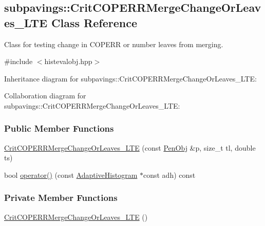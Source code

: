 \hypertarget{classsubpavings_1_1CritCOPERRMergeChangeOrLeaves__LTE}{\subsection{subpavings\-:\-:\-Crit\-C\-O\-P\-E\-R\-R\-Merge\-Change\-Or\-Leaves\-\_\-\-L\-T\-E \-Class \-Reference}
\label{classsubpavings_1_1CritCOPERRMergeChangeOrLeaves__LTE}
}


\-Class for testing change in \-C\-O\-P\-E\-R\-R or number leaves from merging.  




{\ttfamily \#include $<$histevalobj.\-hpp$>$}



\-Inheritance diagram for subpavings\-:\-:\-Crit\-C\-O\-P\-E\-R\-R\-Merge\-Change\-Or\-Leaves\-\_\-\-L\-T\-E\-:


\-Collaboration diagram for subpavings\-:\-:\-Crit\-C\-O\-P\-E\-R\-R\-Merge\-Change\-Or\-Leaves\-\_\-\-L\-T\-E\-:
\subsubsection*{\-Public \-Member \-Functions}
\begin{DoxyCompactItemize}
\item 
\hyperlink{classsubpavings_1_1CritCOPERRMergeChangeOrLeaves__LTE_a9654a25628d97154868b73eabdaeda55}{\-Crit\-C\-O\-P\-E\-R\-R\-Merge\-Change\-Or\-Leaves\-\_\-\-L\-T\-E} (const \hyperlink{classsubpavings_1_1PenObj}{\-Pen\-Obj} \&p, size\-\_\-t tl, double ts)
\item 
bool \hyperlink{classsubpavings_1_1CritCOPERRMergeChangeOrLeaves__LTE_a7ddbaf53665373ee069626351e40252c}{operator()} (const \hyperlink{classsubpavings_1_1AdaptiveHistogram}{\-Adaptive\-Histogram} $\ast$const adh) const 
\end{DoxyCompactItemize}
\subsubsection*{\-Private \-Member \-Functions}
\begin{DoxyCompactItemize}
\item 
\hyperlink{classsubpavings_1_1CritCOPERRMergeChangeOrLeaves__LTE_a46ea02db450dfee9d5908ce55a714779}{\-Crit\-C\-O\-P\-E\-R\-R\-Merge\-Change\-Or\-Leaves\-\_\-\-L\-T\-E} ()
\end{DoxyCompactItemize}
